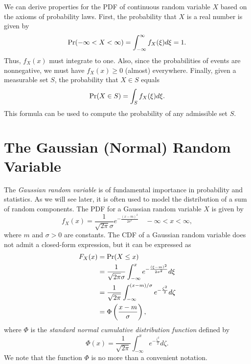 We can derive properties for the PDF of continuous random variable $X$ based on the axioms of probability laws.
First, the probability that $X$ is a real number is given by
\begin{equation*}
\Pr (-\infty < X < \infty) = \int_{-\infty}^{\infty} f_X (\xi) d\xi = 1.
\end{equation*}
Thus, $f_X (x)$ must integrate to one.
Also, since the probabilities of events are nonnegative, we must have $f_X (x) \geq 0$ (almost) everywhere.
Finally, given a measurable set $S$, the probability that $X \in S$ equals
\begin{equation*}
\Pr (X \in S) = \int_S f_X (\xi) d\xi .
\end{equation*}
This formula can be used to compute the probability of any admissible set $S$.


\section{The Gaussian (Normal) Random Variable}

The \emph{Gaussian random variable} is of fundamental importance in probability and statistics.
As we will see later, it is often used to model the distribution of a sum of random components.
The PDF for a Gaussian random variable $X$ is given by
\begin{equation*}
f_X (x) = \frac{1}{\sqrt{2 \pi} \sigma} e^{- \frac{(x - m)^2}{2 \sigma^2}}
\quad - \infty < x < \infty,
\end{equation*}
where $m$ and $\sigma > 0$ are constants.
The CDF of a Gaussian random variable does not admit a closed-form expression, but it can be expressed as
\begin{equation*}
\begin{split}
F_X (x) &= \Pr (X \leq x) \\
&= \frac{1}{\sqrt{2 \pi} \sigma}
\int_{- \infty}^{x} e^{- \frac{(\xi - m)^2}{2 \sigma^2}} d\xi \\
&= \frac{1}{\sqrt{2 \pi}}
\int_{- \infty}^{(x - m)/\sigma} e^{- \frac{\zeta^2}{2}} d\zeta \\
&= \Phi \left( \frac{x - m}{\sigma} \right),
\end{split}
\end{equation*}
where $\Phi$ is the \emph{standard normal cumulative distribution function} defined by
\begin{equation*}
\Phi (x) = 
\frac{1}{\sqrt{2 \pi}} \int_{-\infty}^x e^{-\frac{\zeta^2}{2}} d\zeta .
\end{equation*}
We note that the function $\Phi$ is no more than a convenient notation.

